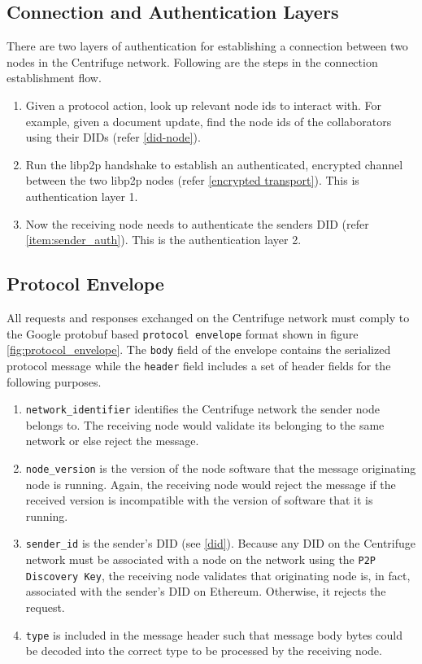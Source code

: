 \subsection{Connection and Authentication Layers}

There are two layers of authentication for establishing a connection between two nodes in the Centrifuge network. Following are the steps in the connection establishment flow.

\begin{enumerate}
  \item Given a protocol action, look up relevant node ids to interact with. For example, given a document update, find the node ids of the collaborators using their DIDs (refer \ref{did-node}).
  \item Run the libp2p handshake to establish an authenticated, encrypted channel between the two libp2p nodes (refer \ref{encrypted transport}). This is authentication layer 1.
  \item Now the receiving node needs to authenticate the senders DID (refer \ref{item:sender_auth}). This is the authentication layer 2.
\end{enumerate}

\subsection{Protocol Envelope}\label{sec:protocol_envelope}

All requests and responses exchanged on the Centrifuge network must comply to the Google protobuf based \texttt{protocol envelope} format shown in figure \ref{fig:protocol_envelope}. The \texttt{body} field of the envelope contains the serialized protocol message while the \texttt{header} field includes a set of header fields for the following purposes.

\begin{enumerate}
  \item \texttt{network\_identifier} identifies the Centrifuge network the sender node belongs to. The receiving node would validate its belonging to the same network or else reject the message.
  \item \texttt{node\_version} is the version of the node software that the message originating node is running. Again, the receiving node would reject the message if the received version is incompatible with the version of software that it is running.
  \item \texttt{sender\_id} is the sender's DID (see \ref{did}). Because any DID on the Centrifuge network must be associated with a node on the network using the \texttt{P2P Discovery Key}, the receiving node validates that originating node is, in fact, associated with the sender's DID on Ethereum. Otherwise, it rejects the request. \label{item:sender_auth}
  \item \texttt{type} is included in the message header such that message body bytes could be decoded into the correct type to be processed by the receiving node.
\end{enumerate}


